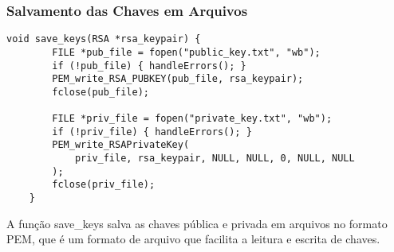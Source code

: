 \documentclass[a4paper,12pt]{article}
\begin{document}
\subsubsection*{Salvamento das Chaves em Arquivos}
\begin{lstlisting}[style=CStyle]
    void save_keys(RSA *rsa_keypair) {
        FILE *pub_file = fopen("public_key.txt", "wb");
        if (!pub_file) { handleErrors(); }
        PEM_write_RSA_PUBKEY(pub_file, rsa_keypair);
        fclose(pub_file);

        FILE *priv_file = fopen("private_key.txt", "wb");
        if (!priv_file) { handleErrors(); }
        PEM_write_RSAPrivateKey(
            priv_file, rsa_keypair, NULL, NULL, 0, NULL, NULL
        );
        fclose(priv_file);
    }
\end{lstlisting}
A função save\_keys salva as chaves pública e privada em arquivos no formato PEM, que é um formato de arquivo que facilita a leitura e escrita de chaves.
\end{document}
